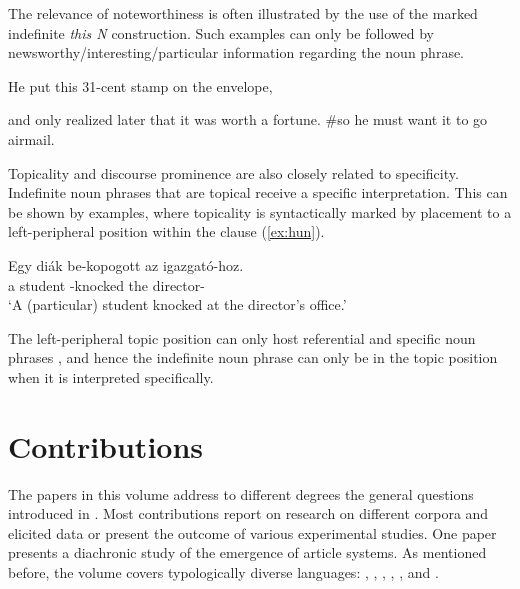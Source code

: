 \documentclass[output=paper]{langsci/langscibook}
\begin{document}
{
The relevance of noteworthiness is often illustrated by the use of the marked indefinite {\emph{this N}} construction. Such examples can only be followed by newsworthy/interesting/particular information regarding the noun phrase. 
}

\begin{exe}
\ex He put this 31-cent stamp on the envelope, \hfill\citep[after][]{maclaran:82}
	\begin{xlista}
	\ex and only realized later that it was worth a fortune.
	\ex \#so he must want it to go airmail.
	\end{xlista}
\end{exe}	

Topicality and discourse prominence are also closely related to specificity. Indefinite noun phrases that are topical receive a specific interpretation. This can be shown by  examples, where topicality is syntactically marked by placement to a left-peripheral position within the clause (\ref{ex:hun}). 

\begin{exe}
\ex\label{ex:hun}
\gll Egy di\'ak be-kopogott az igazgató-hoz. \\
a student {}-knocked the director-{}\\
\glt `A (particular) student knocked at the director's office.'
\end{exe}

The left-peripheral topic position can only host referential and specific noun phrases \citep[e.\,g.,][]{ekiss:02}, and hence the indefinite noun phrase can only be in the topic position when it is interpreted specifically.


\section{Contributions}

The papers in this volume address to different degrees the general questions introduced in . Most contributions report on research on different corpora and elicited data or present the outcome of various experimental studies. One paper presents a diachronic study of the emergence of article systems. As mentioned before, the volume covers typologically diverse languages: , , , , ,  and .
\end{document}
